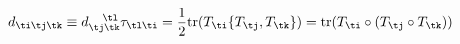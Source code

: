 \begin{equation}\label{dsymbols}
d_{\ti\tj\tk}\equiv d_{\tj\tk}^{~~~\tl} \tau_{\tl\ti} = \frac{1}{2}
\textrm{tr}(T_{\ti}\{ T_{\tj}, T_{\tk}\})=  
\textrm{tr} (T_{\ti}\circ (T_{\tj}\circ
T_{\tk})) 
\end{equation}

